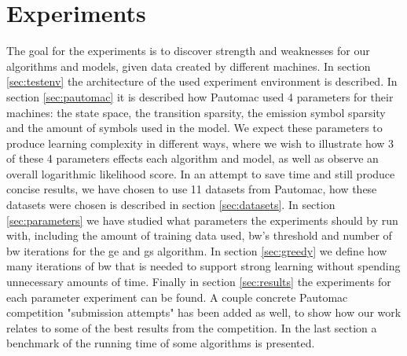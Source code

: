 \chapter{Experiments}
\label{chap:experiments}
The goal for the experiments is to discover strength and weaknesses for our algorithms and models, given data created by different machines. In section \ref{sec:testenv} the architecture of the used experiment environment is described. In section \ref{sec:pautomac} it is described how Pautomac used 4 parameters for their machines: the state space, the transition sparsity, the emission symbol sparsity and the amount of symbols used in the model. We expect these parameters to produce learning complexity in different ways, where we wish to illustrate how 3 of these 4 parameters effects each algorithm and model, as well as observe an overall logarithmic likelihood score. In an attempt to save time and still produce concise results, we have chosen to use 11 datasets from Pautomac, how these datasets were chosen is described in section \ref{sec:datasets}. In section \ref{sec:parameters} we have studied what parameters the experiments should by run with, including the amount of training data used, \gls{bw}'s threshold and number of \gls{bw} iterations for the \gls{ge} and \gls{gs} algorithm. In section \ref{sec:greedy} we define how many iterations of \gls{bw} that is needed to support strong learning without spending unnecessary amounts of time.
Finally in section \ref{sec:results} the experiments for each parameter experiment can be found. A couple concrete Pautomac competition "submission attempts" has been added as well, to show how our work relates to some of the best results from the competition. In the last section a benchmark of the running time of some algorithms is presented.

%



\FloatBarrier


